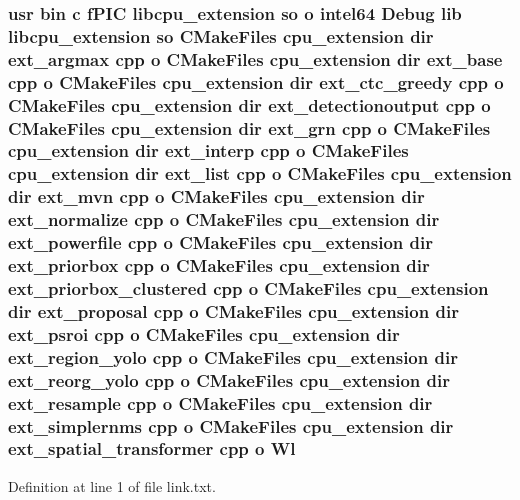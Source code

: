 \subsubsection[{\texorpdfstring{Wl}{Wl}}]{\setlength{\rightskip}{0pt plus 5cm}usr bin {\bf c} f\+P\+IC libcpu\+\_\+extension {\bf so} o intel64 Debug lib libcpu\+\_\+extension {\bf so} C\+Make\+Files {\bf cpu\+\_\+extension} dir ext\+\_\+argmax cpp o C\+Make\+Files {\bf cpu\+\_\+extension} dir ext\+\_\+base cpp o C\+Make\+Files {\bf cpu\+\_\+extension} dir ext\+\_\+ctc\+\_\+greedy cpp o C\+Make\+Files {\bf cpu\+\_\+extension} dir ext\+\_\+detectionoutput cpp o C\+Make\+Files {\bf cpu\+\_\+extension} dir ext\+\_\+grn cpp o C\+Make\+Files {\bf cpu\+\_\+extension} dir ext\+\_\+interp cpp o C\+Make\+Files {\bf cpu\+\_\+extension} dir ext\+\_\+list cpp o C\+Make\+Files {\bf cpu\+\_\+extension} dir ext\+\_\+mvn cpp o C\+Make\+Files {\bf cpu\+\_\+extension} dir ext\+\_\+normalize cpp o C\+Make\+Files {\bf cpu\+\_\+extension} dir ext\+\_\+powerfile cpp o C\+Make\+Files {\bf cpu\+\_\+extension} dir ext\+\_\+priorbox cpp o C\+Make\+Files {\bf cpu\+\_\+extension} dir ext\+\_\+priorbox\+\_\+clustered cpp o C\+Make\+Files {\bf cpu\+\_\+extension} dir ext\+\_\+proposal cpp o C\+Make\+Files {\bf cpu\+\_\+extension} dir ext\+\_\+psroi cpp o C\+Make\+Files {\bf cpu\+\_\+extension} dir ext\+\_\+region\+\_\+yolo cpp o C\+Make\+Files {\bf cpu\+\_\+extension} dir ext\+\_\+reorg\+\_\+yolo cpp o C\+Make\+Files {\bf cpu\+\_\+extension} dir ext\+\_\+resample cpp o C\+Make\+Files {\bf cpu\+\_\+extension} dir ext\+\_\+simplernms cpp o C\+Make\+Files {\bf cpu\+\_\+extension} dir ext\+\_\+spatial\+\_\+transformer cpp o Wl}\hypertarget{thirdparty_2extension_2CMakeFiles_2cpu__extension_8dir_2link_8txt_af9ccbf658ed2deb89d0d79f211e5b033}{}\label{thirdparty_2extension_2CMakeFiles_2cpu__extension_8dir_2link_8txt_af9ccbf658ed2deb89d0d79f211e5b033}


Definition at line 1 of file link.\+txt.


